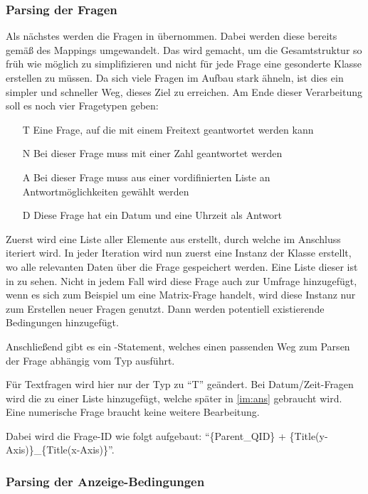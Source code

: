 \subsubsection{Parsing der Fragen}

Als nächstes werden die Fragen in  übernommen. Dabei werden diese bereits gemäß des Mappings umgewandelt.
Das wird gemacht, um die Gesamtstruktur so früh wie möglich zu simplifizieren und nicht für jede Frage eine gesonderte Klasse erstellen zu müssen.
Da sich viele Fragen im Aufbau stark ähneln, ist dies ein simpler und schneller Weg, dieses Ziel zu erreichen.
Am Ende dieser Verarbeitung soll es noch vier Fragetypen geben:

\begin{enumerate}
\item[T] Eine Frage, auf die mit einem Freitext geantwortet werden kann
\item[N] Bei dieser Frage muss mit einer Zahl geantwortet werden
\item[A] Bei dieser Frage muss aus einer vordifinierten Liste an Antwortmöglichkeiten gewählt werden
\item[D] Diese Frage hat ein Datum und eine Uhrzeit als Antwort
\end{enumerate}

Zuerst wird eine Liste aller  Elemente aus  erstellt, durch welche im Anschluss iteriert wird.
In jeder Iteration wird nun zuerst eine Instanz der Klasse  erstellt, wo alle relevanten Daten über die Frage gespeichert werden.
Eine Liste dieser ist in %
zu sehen.
Nicht in jedem Fall wird diese Frage auch zur Umfrage hinzugefügt, wenn es sich zum Beispiel um eine Matrix-Frage handelt, wird diese Instanz nur zum Erstellen neuer Fragen genutzt.
Dann werden potentiell existierende Bedingungen hinzugefügt. %

Anschließend gibt es ein -Statement, welches einen passenden Weg zum Parsen der Frage abhängig vom Typ ausführt.

Für Textfragen wird hier nur der Typ zu \enquote{T} geändert.
Bei Datum/Zeit-Fragen wird die  zu einer Liste hinzugefügt, welche später in \cref{im:ans} gebraucht wird.
Eine numerische Frage braucht keine weitere Bearbeitung.


Dabei wird die Frage-ID wie folgt aufgebaut: \enquote{\{Parent\_QID\} + \{Title(y-Axis)\}\_\{Title(x-Axis)\}}.

\subsubsection{Parsing der Anzeige-Bedingungen}
\label{im:cond}

